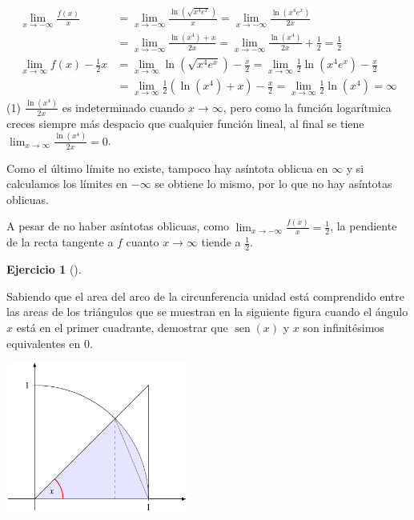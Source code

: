 \documentclass[
  a4paper,
]{scrreport}
\theoremstyle{definition}
\newtheorem{exercise}{Ejercicio}[chapter]
\theoremstyle{remark}
\begin{document}
\begin{tcolorbox}
\begin{align*}
\lim_{x\to -\infty} \frac{f(x)}{x}
&= \lim_{x\to -\infty} \frac{\ln(\sqrt{x^4e^x})}{x}
= \lim_{x\to -\infty} \frac{\ln(x^4e^x)}{2x} \\
&= \lim_{x\to -\infty} \frac{\ln(x^4)+x}{2x} 
= \lim_{x\to -\infty} \frac{\ln(x^4)}{2x} + \frac{1}{2}
= \frac{1}{2} \tag{1}\\
\lim_{x\to \infty} f(x) -\frac{1}{2}x
&= \lim_{x\to \infty} \ln(\sqrt{x^4e^x}) - \frac{x}{2}
= \lim_{x\to \infty} \frac{1}{2}\ln(x^4e^x) - \frac{x}{2} \\
&= \lim_{x\to \infty} \frac{1}{2}(\ln(x^4)+x) - \frac{x}{2}
= \lim_{x\to \infty} \frac{1}{2}\ln(x^4)
= \infty
\end{align*} (1) \(\frac{\ln(x^4)}{2x}\) es indeterminado cuando
\(x\to\infty\), pero como la función logarítmica creces siempre más
despacio que cualquier función lineal, al final se tiene
\(\lim_{x\to\infty} \frac{\ln(x^4)}{2x} = 0\).

Como el último límite no existe, tampoco hay asíntota oblicua en
\(\infty\) y si calculamos los límites en \(-\infty\) se obtiene lo
mismo, por lo que no hay asíntotas oblicuas.

A pesar de no haber asíntotas oblicuas, como
\(\lim_{x\to -\infty} \frac{f(x)}{x} =\frac{1}{2}\), la pendiente de la
recta tangente a \(f\) cuanto \(x\to \infty\) tiende a \(\frac{1}{2}\).

\end{tcolorbox}

\begin{exercise}[]\protect\hypertarget{exr-4}{}\label{exr-4}

Sabiendo que el area del arco de la circunferencia unidad está
comprendido entre las areas de los triángulos que se muestran en la
siguiente figura cuando el ángulo \(x\) está en el primer cuadrante,
demostrar que \(\operatorname{sen}(x)\) y \(x\) son infinitésimos
equivalentes en \(0\).

\includegraphics[width=6cm,height=5cm]{img/examen-2024-01-11/arco-circunferencia.pdf}

\end{exercise}
\end{document}
